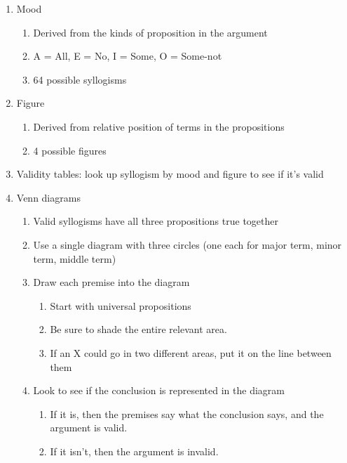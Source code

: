\documentclass[10pt,landscape]{article}
\begin{document}
\begin{multicols}{2}
\begin{enumerate}
       \item Mood
	\begin{enumerate}
	 \item Derived from the kinds of proposition in the argument
	 \item A = All, E = No, I = Some, O = Some-not
	 \item 64 possible syllogisms
	\end{enumerate}
      \item Figure
	\begin{enumerate}
	 \item Derived from relative position of terms in the propositions
	 \item 4 possible figures
	\end{enumerate}
      \item Validity tables: look up syllogism by mood and figure to see if it's valid
      \item Venn diagrams
	\begin{enumerate}
	 \item Valid syllogisms have all three propositions true together
	 \item Use a single diagram with three circles (one each for major term, minor term, middle term)
	 \item Draw each premise into the diagram
	  \begin{enumerate}
	   \item Start with universal propositions
	   \item Be sure to shade the entire relevant area.
	   \item If an X could go in two different areas, put it on the line between them
	  \end{enumerate}
	\item Look to see if the conclusion is represented in the diagram
	  \begin{enumerate}
	   \item If it is, then the premises say what the conclusion says, and the argument is valid.
	   \item If it isn't, then the argument is invalid.
	  \end{enumerate}
	\end{enumerate}
      \end{enumerate}

\end{multicols}
\end{document}
